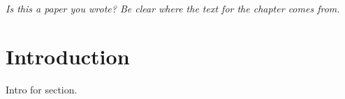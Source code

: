 
\textit{Is this a paper you wrote?  Be clear where the text for the chapter comes from.}

\section{Introduction}
\label{c3_sec:Introduction}

Intro for section.  

